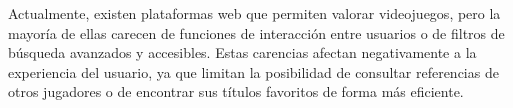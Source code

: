 Actualmente, existen plataformas web que permiten valorar videojuegos, 
pero la mayoría de ellas carecen de funciones de interacción entre usuarios o de filtros de búsqueda avanzados y accesibles. Estas carencias afectan negativamente 
a la experiencia del usuario, ya que limitan la posibilidad de consultar 
referencias de otros jugadores o de encontrar sus títulos favoritos de forma más eficiente.
